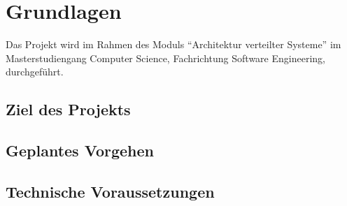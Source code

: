 \chapter{Grundlagen}
Das Projekt wird im Rahmen des Moduls \enquote{Architektur verteilter Systeme} im Masterstudiengang Computer Science, Fachrichtung Software Engineering, durchgeführt.


\section{Ziel des Projekts}

\section{Geplantes Vorgehen}

\section{Technische Voraussetzungen}
